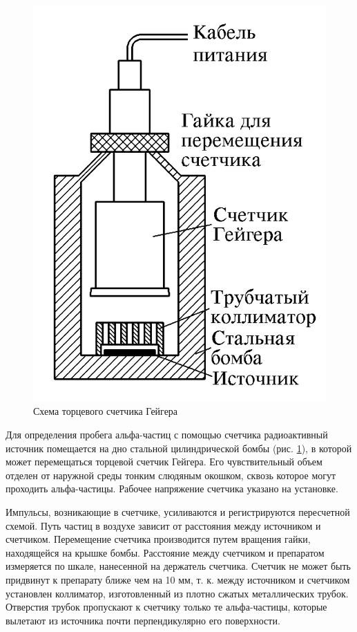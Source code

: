 \documentclass[a4paper, 12pt]{article}
\begin{document}
	\begin{figure}
		\includegraphics[width=\linewidth]{Geyger}
		\caption{Схема торцевого счетчика Гейгера}
		\label{ris geyger}
	\end{figure}
	
	Для определения пробега альфа-частиц с помощью счетчика радиоактивный источник помещается на дно стальной цилиндрической бомбы
	(рис. \ref{ris geyger}), в которой может перемещаться торцевой счетчик Гейгера. Его
	чувствительный объем отделен от наружной среды тонким слюдяным
	окошком, сквозь которое могут проходить альфа-частицы. Рабочее напряжение счетчика указано на установке.
	
	Импульсы, возникающие в счетчике, усиливаются и регистрируются пересчетной схемой. Путь частиц в воздухе зависит от расстояния между источником и счетчиком. Перемещение счетчика производится путем вращения гайки, находящейся на крышке бомбы. Расстояние
	между счетчиком и препаратом измеряется по шкале, нанесенной на
	держатель счетчика. Счетчик не может быть придвинут к препарату ближе чем на 10 мм, т. к. между источником и счетчиком установлен коллиматор, изготовленный из плотно сжатых металлических трубок. Отверстия трубок пропускают к счетчику только те альфа-частицы, которые вылетают из источника почти перпендикулярно его поверхности.
	
\end{document}

